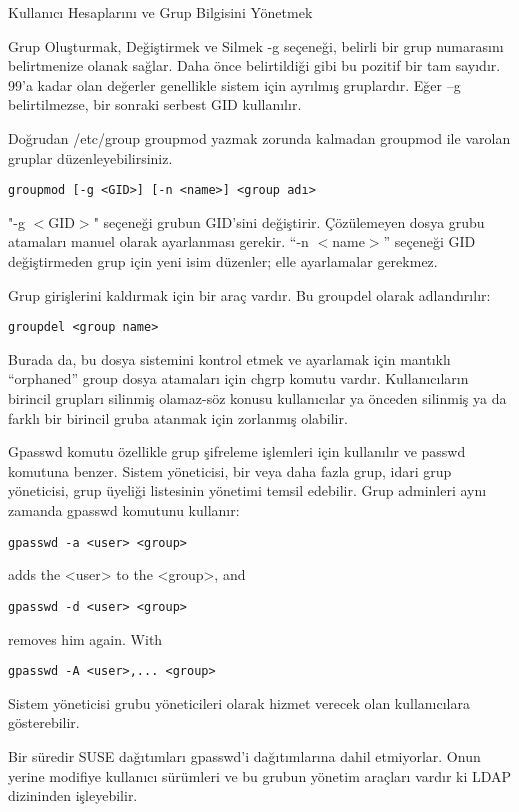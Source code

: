 \begin{section}{Kullanıcı Hesaplarını ve Grup Bilgisini Yönetmek}
\begin{subsection}{Grup Oluşturmak, Değiştirmek ve Silmek}
-g seçeneği, belirli bir grup numarasını belirtmenize olanak sağlar. Daha önce belirtildiği gibi bu pozitif bir tam sayıdır. 99'a kadar olan değerler genellikle sistem için ayrılmış gruplardır. Eğer –g belirtilmezse, bir sonraki serbest GID kullanılır.

Doğrudan /etc/group groupmod yazmak zorunda kalmadan groupmod ile varolan gruplar düzenleyebilirsiniz.
\begin{verbatim}
groupmod [-g <GID>] [-n <name>] <group adı>
\end{verbatim}

"-g $<$GID$>$" seçeneği grubun GID'sini değiştirir. Çözülemeyen dosya grubu atamaları
manuel olarak ayarlanması gerekir. “-n $<$name$>$” seçeneği GID değiştirmeden grup için yeni isim düzenler; elle ayarlamalar gerekmez.

Grup girişlerini kaldırmak için bir araç vardır. Bu groupdel olarak adlandırılır:
\begin{verbatim}
groupdel <group name>
\end{verbatim}

Burada da, bu dosya sistemini kontrol etmek ve ayarlamak için mantıklı “orphaned” group dosya atamaları için chgrp komutu vardır. Kullanıcıların birincil grupları silinmiş olamaz-söz konusu kullanıcılar ya önceden silinmiş ya da farklı bir birincil gruba atanmak için zorlanmış olabilir.

Gpasswd komutu özellikle grup şifreleme işlemleri için kullanılır ve passwd komutuna benzer. Sistem yöneticisi, bir veya daha fazla grup, idari grup yöneticisi, grup üyeliği listesinin yönetimi temsil edebilir. Grup adminleri aynı zamanda gpasswd komutunu kullanır:
\begin{verbatim}
gpasswd -a <user> <group>
\end{verbatim}

adds the <user> to the <group>, and
\begin{verbatim}
gpasswd -d <user> <group>
\end{verbatim}

removes him again. With
\begin{verbatim}
gpasswd -A <user>,... <group>
\end{verbatim}

Sistem yöneticisi grubu yöneticileri olarak hizmet verecek olan kullanıcılara gösterebilir.

Bir süredir SUSE dağıtımları gpasswd'i dağıtımlarına dahil etmiyorlar. Onun yerine
modifiye kullanıcı sürümleri ve bu grubun yönetim araçları vardır ki LDAP dizininden işleyebilir.


\end{subsection}
\end{section}

